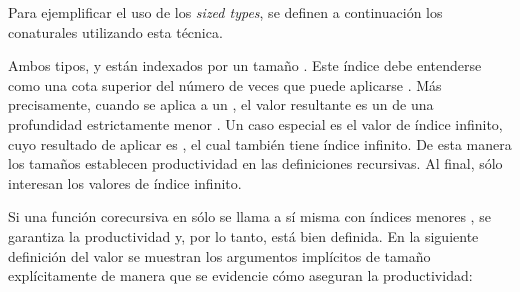 Para ejemplificar el uso de los \textit{sized types}, se definen a continuación los conaturales utilizando esta técnica.


Ambos tipos,  y  están indexados por un tamaño . Este índice debe entenderse como una cota superior del número de veces que puede aplicarse . Más precisamente, cuando se aplica  a un  \AgdaSymbol{:}  , el valor resultante es un  \AgdaSymbol{:}   de una profundidad estrictamente menor  \AgdaSymbol{<} . Un caso especial es el valor  \AgdaSymbol{:}  \AgdaArgument{$\infty$} de índice infinito, cuyo resultado de aplicar  es  \AgdaSymbol{:}  \AgdaArgument{$\infty$}, el cual también tiene índice infinito. De esta manera los tamaños establecen productividad en las definiciones recursivas. Al final, sólo interesan los valores  \AgdaSymbol{:}  \AgdaArgument{$\infty$} de índice infinito.

Si una función corecursiva en   sólo se llama a sí misma con índices menores  \AgdaSymbol{<} , se garantiza la productividad y, por lo tanto, está bien definida. En la siguiente definición del valor  se muestran los argumentos implícitos de tamaño explícitamente de manera que se evidencie cómo aseguran la productividad:

